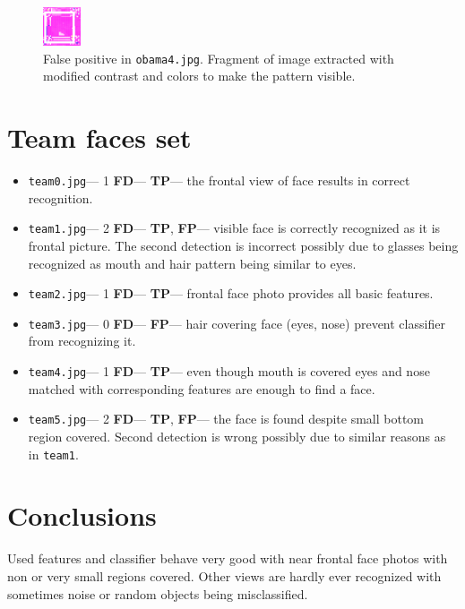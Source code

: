 \documentclass[11pt,a4paper,twocolumn]{article}
\begin{document}
\begin{figure}[htbp]
\centering
  \vspace{-10pt}
\includegraphics[width=0.1\textwidth]{false-positive.png}
  \vspace{-10pt}
\begin{tiny}
\caption{\small False positive in \texttt{obama4.jpg}. Fragment of image extracted with modified contrast and colors to make the pattern visible.\label{img:false-positive}}
\end{tiny}
  \vspace{-15pt}
\end{figure}

\section*{Team faces set}
\begin{itemize}
\item \texttt{team0.jpg}--- 1 \textbf{FD}--- \textbf{TP}--- the frontal view of face results in correct recognition.
\item \texttt{team1.jpg}--- 2 \textbf{FD}--- \textbf{TP}, \textbf{FP}--- visible face is correctly recognized as it is frontal picture. The second detection is incorrect possibly due to glasses being recognized as mouth and hair pattern being similar to eyes.
\item \texttt{team2.jpg}--- 1 \textbf{FD}--- \textbf{TP}--- frontal face photo provides all basic features.
\item \texttt{team3.jpg}--- 0 \textbf{FD}--- \textbf{FP}--- hair covering face (eyes, nose) prevent classifier from recognizing it.
\item \texttt{team4.jpg}--- 1 \textbf{FD}--- \textbf{TP}--- even though mouth is covered eyes and nose matched with corresponding features are enough to find a face.
\item \texttt{team5.jpg}--- 2 \textbf{FD}--- \textbf{TP}, \textbf{FP}--- the face is found despite small bottom region covered. Second detection is wrong possibly due to similar reasons as in \texttt{team1}.
\end{itemize}

\section*{Conclusions}
Used features and classifier behave very good with near frontal face photos with non or very small regions covered. Other views are hardly ever recognized with sometimes noise or random objects being misclassified.
\end{document}
